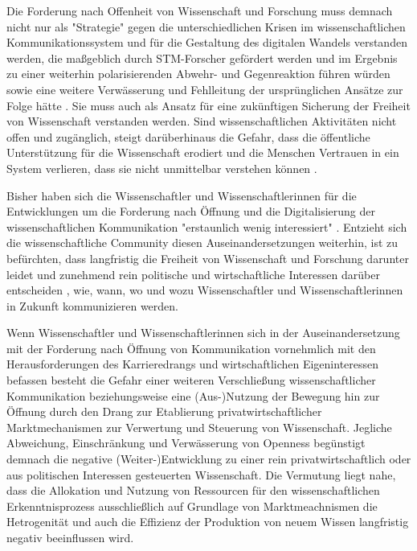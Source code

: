 Die Forderung nach Offenheit von Wissenschaft und Forschung muss demnach nicht nur als "Strategie" gegen die unterschiedlichen Krisen im wissenschaftlichen Kommunikationssystem und für die Gestaltung des digitalen Wandels verstanden werden, die maßgeblich durch STM-Forscher gefördert werden und im Ergebnis zu einer weiterhin polarisierenden Abwehr- und Gegenreaktion führen würden sowie eine weitere Verwässerung und Fehlleitung der ursprünglichen Ansätze zur Folge hätte \cite{naeder_2010_open}. Sie muss auch als Ansatz für eine zukünftigen Sicherung der Freiheit von Wissenschaft verstanden werden. Sind wissenschaftlichen Aktivitäten nicht offen und zugänglich, steigt darüberhinaus die Gefahr, dass die öffentliche Unterstützung für die Wissenschaft erodiert und die Menschen Vertrauen in ein System verlieren, dass sie nicht unmittelbar verstehen können \cite{resnik_2005_ethics}.

Bisher haben sich die Wissenschaftler und Wissenschaftlerinnen für die Entwicklungen um die Forderung nach Öffnung und die Digitalisierung der wissenschaftlichen Kommunikation "erstaunlich wenig interessiert" \cite{hagner_2015_sache_buches}. Entzieht sich die wissenschaftliche Community diesen Auseinandersetzungen weiterhin, ist zu befürchten, dass langfristig die Freiheit von Wissenschaft und Forschung darunter leidet und zunehmend rein politische und wirtschaftliche Interessen darüber entscheiden \cite{Warnke_2012}, wie, wann, wo und wozu Wissenschaftler und Wissenschaftlerinnen in Zukunft kommunizieren werden.

Wenn Wissenschaftler und Wissenschaftlerinnen sich in der Auseinandersetzung mit der Forderung nach Öffnung von Kommunikation vornehmlich mit den Herausforderungen des Karrieredrangs und wirtschaftlichen Eigeninteressen befassen \cite{resnik_2005_ethics} besteht die Gefahr einer weiteren Verschließung wissenschaftlicher Kommunikation beziehungsweise eine (Aus-)Nutzung der Bewegung hin zur Öffnung durch den Drang zur Etablierung privatwirtschaftlicher Marktmechanismen zur Verwertung und Steuerung von Wissenschaft. Jegliche Abweichung, Einschränkung und Verwässerung von Openness begünstigt demnach die negative (Weiter-)Entwicklung zu einer rein privatwirtschaftlich oder aus politischen Interessen gesteuerten Wissenschaft. Die Vermutung liegt nahe, dass die Allokation und Nutzung von Ressourcen für den wissenschaftlichen Erkenntnisprozess ausschließlich auf Grundlage von Marktmeachnismen die Hetrogenität und auch die Effizienz der Produktion von neuem Wissen langfristig negativ beeinflussen wird.


